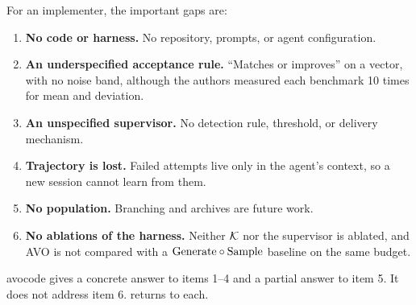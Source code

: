For an implementer, the important gaps are:
\begin{enumerate}[leftmargin=*,itemsep=1pt]
  \item \textbf{No code or harness.} No repository, prompts, or agent configuration.
  \item \textbf{An underspecified acceptance rule.} ``Matches or improves'' on a vector, with no
    noise band, although the authors measured each benchmark 10 times for mean and deviation.
  \item \textbf{An unspecified supervisor.} No detection rule, threshold, or delivery mechanism.
  \item \textbf{Trajectory is lost.} Failed attempts live only in the agent's context, so a new
    session cannot learn from them.
  \item \textbf{No population.} Branching and archives are future work.
  \item \textbf{No ablations of the harness.} Neither $\mathcal{K}$ nor the supervisor is ablated, and AVO is
    not compared with a $\mathrm{Generate} \circ \mathrm{Sample}$ baseline on the same budget.
\end{enumerate}
avocode gives a concrete answer to items 1--4 and a partial answer to item 5. It does not address
item 6.  returns to each.
